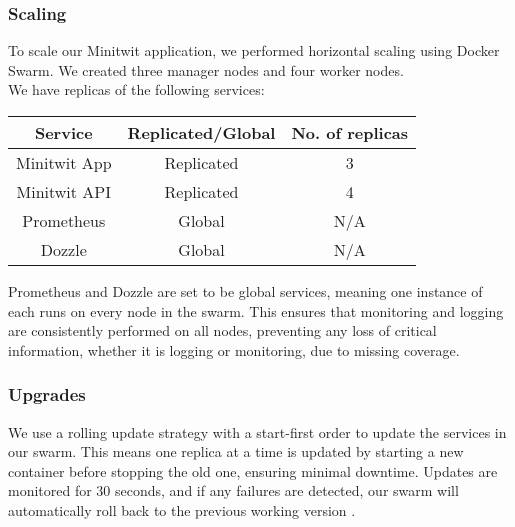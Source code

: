\subsubsection{Scaling}
To scale our Minitwit application, we performed horizontal scaling using Docker Swarm. We created three manager nodes and four worker nodes. \\
We have replicas of the following services:
\begin{center}
\begin{tabular}{ |c|c|c| } 
 \hline
 Service & Replicated/Global & No. of replicas \\ 
 \hline
 Minitwit App & Replicated & 3 \\ 
 \hline
 Minitwit API & Replicated & 4 \\
 \hline
 Prometheus & Global & N/A \\ 
 \hline
 Dozzle & Global & N/A \\ 
 \hline
\end{tabular}
\end{center}

Prometheus and Dozzle are set to be global services, meaning one instance of each runs on every node in the swarm. This ensures that monitoring and logging are consistently performed on all nodes, preventing any loss of critical information, whether it is logging or monitoring, due to missing coverage. 

\subsubsection{Upgrades}
We use a rolling update strategy with a start-first order to update the services in our swarm. This means one replica at a time is updated by starting a new container before stopping the old one, ensuring minimal downtime. Updates are monitored for 30 seconds, and if any failures are detected, our swarm will automatically roll back to the previous working version \cite{dockerComposeDeploy}.